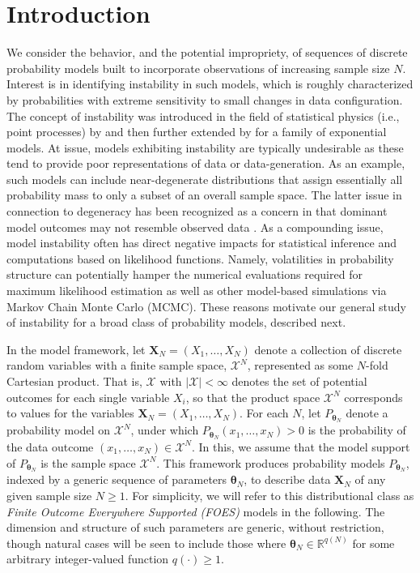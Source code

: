 \documentclass[numbib]{imamat}
\theoremstyle{theorem}
\theoremstyle{lemma}
\theoremstyle{example}
\theoremstyle{corollary}
\theoremstyle{definition}
\theoremstyle{remark}
\theoremstyle{approximation}
\theoremstyle{scheme}
\begin{document}
\hypertarget{introduction}{%
\section{Introduction}\label{introduction}}

We consider the behavior, and the potential impropriety, of sequences of
discrete probability models built to incorporate observations of
increasing sample size \(N\). Interest is in identifying instability in
such models, which is roughly characterized by probabilities with
extreme sensitivity to small changes in data configuration. The concept
of instability was introduced in the field of statistical physics (i.e.,
point processes) by \citet{ruelle1999statistical} and then further
extended by \citet{schweinberger2011instability} for a family of
exponential models. At issue, models exhibiting instability are
typically undesirable as these tend to provide poor representations of
data or data-generation. As an example, such models can include
near-degenerate distributions that assign essentially all probability
mass to only a subset of an overall sample space. The latter issue in
connection to degeneracy has been recognized as a concern in that
dominant model outcomes may not resemble observed data
\citep[cf.][]{handcock2003assessing}. As a compounding issue, model
instability often has direct negative impacts for statistical inference
and computations based on likelihood functions. Namely, volatilities in
probability structure can potentially hamper the numerical evaluations
required for maximum likelihood estimation as well as other model-based
simulations via Markov Chain Monte Carlo (MCMC). These reasons motivate
our general study of instability for a broad class of probability
models, described next.

In the model framework, let \(\boldsymbol X_N = (X_1, \dots, X_N)\)
denote a collection of discrete random variables with a finite sample
space, \(\mathcal{X}^N\), represented as some \(N\)-fold Cartesian
product. That is, \(\mathcal{X}\) with \(|\mathcal{X}| < \infty\)
denotes the set of potential outcomes for each single variable \(X_i\),
so that the product space \(\mathcal{X}^N\) corresponds to values for
the variables \(\boldsymbol X_N=(X_1,\ldots,X_N)\). For each \(N\), let
\(P_{\boldsymbol \theta_N}\) denote a probability model on
\(\mathcal{X}^N\), under which
\(P_{\boldsymbol \theta_N}(x_1, \dots, x_N) > 0\) is the probability of
the data outcome \((x_1, \dots, x_N) \in \mathcal{X}^N\). In this, we
assume that the model support of \(P_{\boldsymbol \theta_N}\) is the
sample space \(\mathcal{X}^N\). This framework produces probability
models \(P_{\boldsymbol \theta_N}\), indexed by a generic sequence of
parameters \(\boldsymbol \theta_N\), to describe data
\(\boldsymbol X_N\) of any given sample size \(N \geq 1\). For
simplicity, we will refer to this distributional class as \emph{Finite
Outcome Everywhere Supported (FOES)} models in the following. The
dimension and structure of such parameters are generic, without
restriction, though natural cases will be seen to include those where
\(\boldsymbol \theta_N \in \mathbb{R}^{q(N)}\) for some arbitrary
integer-valued function \(q(\cdot) \geq 1\).
\end{document}
